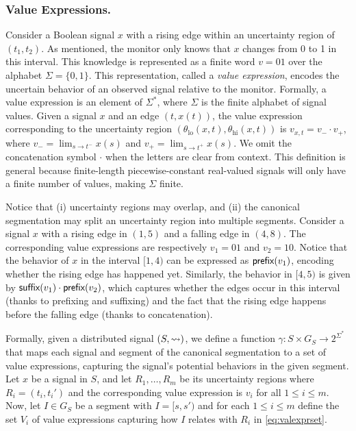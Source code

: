 \subsubsection{Value Expressions.}
Consider a Boolean signal \( x \) with a rising edge within an uncertainty region of \((t_1, t_2)\).
As mentioned, the monitor only knows that \( x \) changes from 0 to 1 in this interval.
This knowledge is represented as a finite word \( v = 01 \) over the alphabet \(\Sigma = \{0,1\}\).
This representation, called a \emph{value expression}, encodes the uncertain behavior of an observed signal relative to the monitor.
Formally, a value expression is an element of \(\Sigma^*\), where \(\Sigma\) is the finite alphabet of signal values.
Given a signal \( x \) and an edge \((t, x(t))\), the value expression corresponding to the uncertainty region \((\theta_{\text{lo}}(x,t), \theta_{\text{hi}}(x,t))\) is \( v_{x,t} = v_- \cdot v_+ \), where \( v_- = \lim_{s \to t^-} x(s) \) and \( v_+ = \lim_{s \to t^+} x(s) \).
We omit the concatenation symbol \(\cdot\) when the letters are clear from context.
This definition is general because finite-length piecewise-constant real-valued signals will only have a finite number of values, making \(\Sigma\) finite.

Notice that (i) uncertainty regions may overlap, and (ii) the canonical segmentation may split an uncertainty region into multiple segments.
Consider a signal $x$ with a rising edge in $(1,5)$ and a falling edge in $(4,8)$.
The corresponding value expressions are respectively $v_1 = 01$ and $v_2 = 10$.
Notice that the behavior of $x$ in the interval $[1,4)$ can be expressed as $\textsf{prefix}(v_1)$, encoding whether the rising edge has happened yet.
Similarly, the behavior in $[4,5)$ is given by $\textsf{suffix}(v_1) \cdot \textsf{prefix}(v_2)$, which captures whether the edges occur in this interval (thanks to prefixing and suffixing) and the fact that the rising edge happens before the falling edge (thanks to concatenation).

%	
%

Formally, given a distributed signal $(S,{\rightsquigarrow})$, we define a function $\gamma : S \times G_S \to 2^{\Sigma^*}$ that maps each signal and segment of the canonical segmentation to a set of value expressions, capturing the signal's potential behaviors in the given segment.
Let $x$ be a signal in $S$, and let $R_1, \ldots, R_m$ be its uncertainty regions where $R_i = (t_i, t_i')$ and the corresponding value expression is $v_i$ for all $1 \leq i \leq m$.
Now, let $I \in G_S$ be a segment with $I = [s, s')$ and for each $1 \leq i \leq m$ define the set $V_i$ of value expressions capturing how $I$ relates with $R_i$ in \cref{eq:valexprset}.


